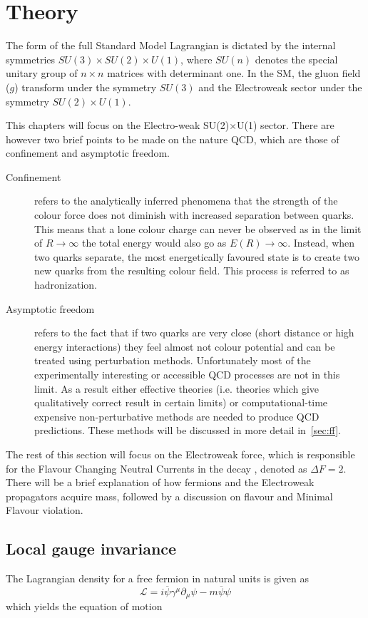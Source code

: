 \section{Theory}
The form of the full Standard Model Lagrangian is dictated by the internal symmetries $SU(3)\times SU(2)\times U(1)$, where $SU(n)$ denotes the special unitary group of $n \times n$ matrices with determinant one. In the SM, the gluon field ($g$) transform under the symmetry $SU(3)$ and the Electroweak sector under the symmetry $SU(2)\times U(1)$.

This chapters will focus on the Electro-weak SU(2)$\times$U(1) sector.  There are however two brief points to be made on the nature QCD, which are those of confinement and asymptotic freedom.

\begin{description}
\item [Confinement] refers to the analytically inferred phenomena that the  strength of the colour force does not diminish with increased separation between quarks. This means that a lone colour charge can never be observed as in the limit of $R\to \infty$ the total energy would also go as $E(R)\to \infty$. Instead, when two quarks separate, the most energetically favoured state is to create two new quarks from the resulting colour field. This process is referred to as hadronization.

\item[Asymptotic freedom] refers to the fact that if two quarks are very close (short distance or high energy interactions) they feel almost not colour potential and can be treated using perturbation methods. Unfortunately most of the experimentally interesting or accessible QCD processes are not in this limit. As a result either effective theories (i.e. theories which give qualitatively correct result in certain limits) or computational-time expensive non-perturbative methods are needed to produce QCD predictions. These methods will be discussed in more detail in~\autoref{sec:ff}.
\end{description}
The rest of this section will focus on the Electroweak force, which is responsible for the Flavour Changing Neutral Currents in the decay \Lbpi, denoted as $\Delta F = 2$. There will be a brief explanation of how fermions and the Electroweak propagators acquire mass, followed by a discussion on flavour and Minimal Flavour violation.

\subsection{Local gauge invariance}
\label{sec:gauge}
The Lagrangian density for a free fermion in natural units is given as
\begin{equation}
  \label{eq:L_free}
  \mathcal{L} = i\overline{\psi}\gamma^{\mu}\partial_{\mu}\psi - m\overline{\psi}\psi
\end{equation}
which yields the equation of motion

